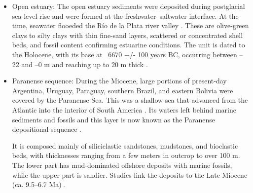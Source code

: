 \begin{itemize}
    \item Open estuary: The open estuary sediments were deposited during postglacial sea-level rise and were formed at the freshwater–saltwater interface. At the time, seawater flooeded the Río de la Plata river valley \autocite{cavallottoEvolucionCambiosAmbientales2005}.
    These are olive-green clays to silty clays with thin fine-sand layers, scattered or concentrated shell beds, and fossil content confirming estuarine conditions. The unit is dated to the Holocene, with its base at ~6670 +/- 100 years BC, occurring between –22 and –0 m and reaching up to 20 m thick \autocite{vogelGroningenRadiocarbonDates1969}.
    
    \item Paranense sequence: During the Miocene, large portions of present-day Argentina, Uruguay, Paraguay, southern Brazil, and eastern Bolivia were covered by the Paranense Sea. This was a shallow sea that advanced from the Atlantic into the interior of South America . Its waters left behind marine sediments and fossils and this layer is now known as the Paranense depositional sequence \autocite{tineoReconstructingSouthAmerican2024}.
    
    It is composed mainly of siliciclastic sandstones, mudstones, and bioclastic beds, with thicknesses ranging from a few meters in outcrop to over 100 m. The lower part has mud-dominated offshore deposits with marine fossils, while the upper part is sandier. Studies link the deposits to the Late Miocene (ca. 9.5–6.7 Ma) \autocite{tineoReconstructingSouthAmerican2024}.
\end{itemize}




